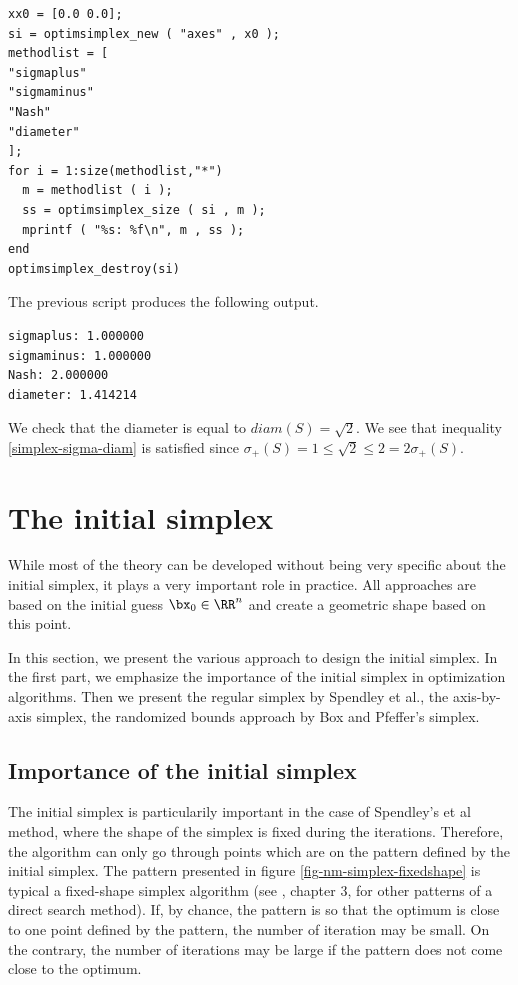 \lstset{language=scilabscript}
\begin{lstlisting}
xx0 = [0.0 0.0];
si = optimsimplex_new ( "axes" , x0 );
methodlist = [
"sigmaplus" 
"sigmaminus"
"Nash"
"diameter"
];
for i = 1:size(methodlist,"*")
  m = methodlist ( i );
  ss = optimsimplex_size ( si , m );
  mprintf ( "%s: %f\n", m , ss );
end
optimsimplex_destroy(si)
\end{lstlisting}
The previous script produces the following output.
\lstset{language=scilabscript}
\begin{lstlisting}
sigmaplus: 1.000000
sigmaminus: 1.000000
Nash: 2.000000
diameter: 1.414214
\end{lstlisting}
We check that the diameter is equal to $diam(S) = \sqrt{2}$.
We see that inequality \ref{simplex-sigma-diam} is satisfied since 
$\sigma_+(S)=1\leq \sqrt{2} \leq 2 = 2\sigma_+(S)$.

\section{The initial simplex}

While most of the theory can be developed without being very specific 
about the initial simplex, it plays a very important role in practice.
All approaches are based on the initial guess $\bx_0\in\RR^n$ and create a 
geometric shape based on this point.

In this section, we present the various approach to design the initial 
simplex. In the first part, we emphasize the importance of the initial
simplex in optimization algorithms. Then we present the regular simplex 
by Spendley et al., the axis-by-axis simplex, the randomized bounds approach by Box and 
Pfeffer's simplex.

\subsection{Importance of the initial simplex}

The initial simplex is particularily important in the case of Spendley's et al 
method, where the shape of the simplex is fixed during the iterations.
Therefore, the algorithm can only go through points which are on the pattern
defined by the initial simplex. The pattern presented in figure \ref{fig-nm-simplex-fixedshape}
is typical a fixed-shape simplex algorithm (see \cite{Torczon89multi-directionalsearch}, chapter 3, 
for other patterns of a direct search method).
If, by chance, the pattern is so that the optimum is close to one point 
defined by the pattern, the number of iteration may be small. On the contrary, the 
number of iterations may be large if the pattern does not come close to the 
optimum.

